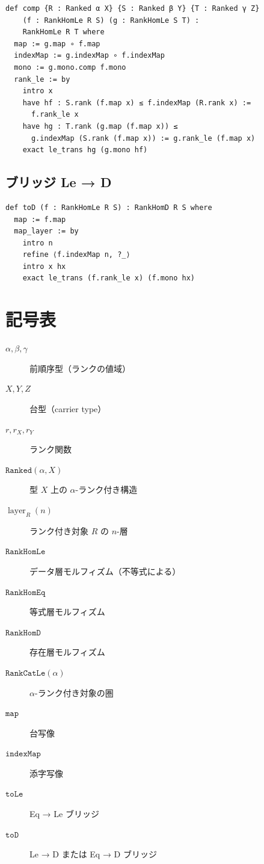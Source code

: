 \documentclass[11pt,a4paper,ja=standard]{bxjsarticle}
\theoremstyle{definition}
\newcommand{\layer}{\operatorname{layer}}
\newcommand{\RankHomLe}{\mathtt{RankHomLe}}
\newcommand{\RankHomEq}{\mathtt{RankHomEq}}
\newcommand{\RankHomD}{\mathtt{RankHomD}}
\newcommand{\RankCatLe}{\mathtt{RankCatLe}}
\newcommand{\Ranked}{\mathtt{Ranked}}
\begin{document}
\begin{verbatim}
def comp {R : Ranked α X} {S : Ranked β Y} {T : Ranked γ Z}
    (f : RankHomLe R S) (g : RankHomLe S T) :
    RankHomLe R T where
  map := g.map ∘ f.map
  indexMap := g.indexMap ∘ f.indexMap
  mono := g.mono.comp f.mono
  rank_le := by
    intro x
    have hf : S.rank (f.map x) ≤ f.indexMap (R.rank x) :=
      f.rank_le x
    have hg : T.rank (g.map (f.map x)) ≤
      g.indexMap (S.rank (f.map x)) := g.rank_le (f.map x)
    exact le_trans hg (g.mono hf)
\end{verbatim}

\subsection{ブリッジ Le → D}

\begin{verbatim}
def toD (f : RankHomLe R S) : RankHomD R S where
  map := f.map
  map_layer := by
    intro n
    refine ⟨f.indexMap n, ?_⟩
    intro x hx
    exact le_trans (f.rank_le x) (f.mono hx)
\end{verbatim}

\section{記号表}

\begin{description}
\item[$\alpha, \beta, \gamma$] 前順序型（ランクの値域）
\item[$X, Y, Z$] 台型（carrier type）
\item[$r, r_X, r_Y$] ランク関数
\item[$\Ranked(\alpha, X)$] 型 $X$ 上の $\alpha$-ランク付き構造
\item[$\layer_R(n)$] ランク付き対象 $R$ の $n$-層
\item[$\RankHomLe$] データ層モルフィズム（不等式による）
\item[$\RankHomEq$] 等式層モルフィズム
\item[$\RankHomD$] 存在層モルフィズム
\item[$\RankCatLe(\alpha)$] $\alpha$-ランク付き対象の圏
\item[$\mathtt{map}$] 台写像
\item[$\mathtt{indexMap}$] 添字写像
\item[$\mathtt{toLe}$] Eq → Le ブリッジ
\item[$\mathtt{toD}$] Le → D または Eq → D ブリッジ
\end{description}
\end{document}
